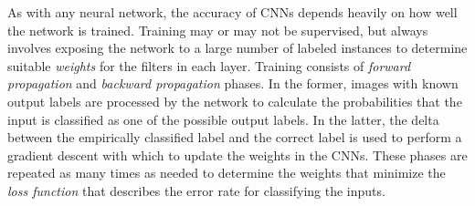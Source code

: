 As with any neural network, the accuracy of CNNs depends heavily on how
well the network is trained. Training may or may not be supervised, but
always involves exposing the network to a large number of labeled
instances to determine suitable \emph{weights} for the filters in each
layer. Training consists of \emph{forward propagation} and
\emph{backward propagation} phases. In the former, images with known
output labels are processed by the network to calculate the probabilities
that the input is classified as one of the possible output labels. In the
latter, the delta between the empirically classified label and the
correct label is used to perform a gradient descent with which to update
the weights in the CNNs. These phases are repeated as many times as
needed to determine the weights that minimize the \emph{loss function}
that describes the error rate for classifying the inputs.
